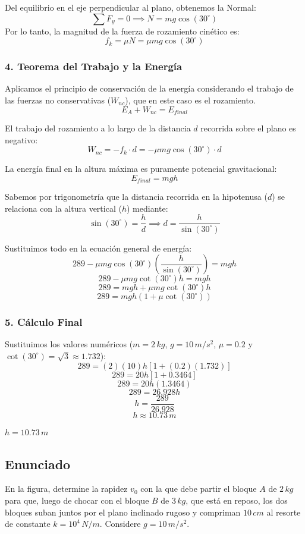 \documentclass[12pt, a4paper]{article}
\begin{document}
Del equilibrio en el eje perpendicular al plano, obtenemos la Normal:
$$ \sum F_y = 0 \implies N = mg \cos(30^\circ) $$
Por lo tanto, la magnitud de la fuerza de rozamiento cinético es:
$$ f_k = \mu N = \mu mg \cos(30^\circ) $$

\subsubsection*{4. Teorema del Trabajo y la Energía}
Aplicamos el principio de conservación de la energía considerando el trabajo de las fuerzas no conservativas ($W_{nc}$), que en este caso es el rozamiento.
$$ E_A + W_{nc} = E_{final} $$

El trabajo del rozamiento a lo largo de la distancia $d$ recorrida sobre el plano es negativo:
$$ W_{nc} = -f_k \cdot d = -\mu mg \cos(30^\circ) \cdot d $$

La energía final en la altura máxima es puramente potencial gravitacional:
$$ E_{final} = mgh $$

Sabemos por trigonometría que la distancia recorrida en la hipotenusa ($d$) se relaciona con la altura vertical ($h$) mediante:
$$ \sin(30^\circ) = \frac{h}{d} \implies d = \frac{h}{\sin(30^\circ)} $$

Sustituimos todo en la ecuación general de energía:
$$ 289 - \mu mg \cos(30^\circ) \left( \frac{h}{\sin(30^\circ)} \right) = mgh $$
$$ 289 - \mu mg \cot(30^\circ) h = mgh $$
$$ 289 = mgh + \mu mg \cot(30^\circ) h $$
$$ 289 = mgh \left( 1 + \mu \cot(30^\circ) \right) $$

\subsubsection*{5. Cálculo Final}
Sustituimos los valores numéricos ($m = 2 \, \si{kg}$, $g = 10 \, \si{m/s^2}$, $\mu = 0.2$ y $\cot(30^\circ) = \sqrt{3} \approx 1.732$):
$$ 289 = (2)(10) h \left[ 1 + (0.2)(1.732) \right] $$
$$ 289 = 20 h \left[ 1 + 0.3464 \right] $$
$$ 289 = 20 h (1.3464) $$
$$ 289 = 26.928 h $$
$$ h = \frac{289}{26.928} $$
$$ h \approx 10.73 \, \si{m} $$

\begin{tcolorbox}[colback=green!5!white, colframe=green!50!black, title=Respuesta Final]
\centering \Large $h = 10.73 \, \si{m}$
\end{tcolorbox}

\newpage

\subsection*{Enunciado}
En la figura, determine la rapidez $v_0$ con la que debe partir el bloque $A$ de $2 \, \si{kg}$ para que, luego de chocar con el bloque $B$ de $3 \, \si{kg}$, que está en reposo, los dos bloques suban juntos por el plano inclinado rugoso y compriman $10 \, \si{cm}$ al resorte de constante $k = 10^4 \, \si{N/m}$. Considere $g = 10 \, \si{m/s^2}$.
\end{document}
